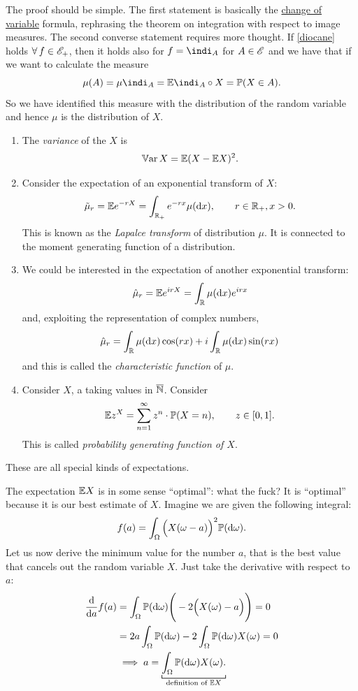 \documentclass{report}
\begin{document}
\begin{fancyproof}
	The proof should be simple. The first statement is basically the \hyperref[eh]{change of variable} formula, rephrasing the theorem on integration with respect to image measures.
	The second converse statement requires more thought. If \ref{diocane} holds $\forall\, f\in\mathscr{E}_+$, then it holds also for $f=\indi_A$ for $A\in\mathscr{E}$ and we have that if we want to calculate the measure 
	\[\mu(A)=\mu\indi_A=\ev\indi_A\circ X=\pr(X\in A).\]
	So we have identified this measure with the distribution of the random variable and hence $\mu$ is the distribution of $X$.
\end{fancyproof}
\begin{example}
	\begin{enumerate}[\circnum]
		\item The \emph{variance} of the \rv{} $X$ is
		\[\mathbb{V}\mathrm{ar}\, X=\mathbb{E}(X-\mathbb{E} X)^2.\]
		\item Consider the expectation of an exponential transform of $X$:
		\[\tilde{\mu}_r=\mathbb{E} e^{-rX}=\int_{\mathbb{R}_+}e^{-rx}\mu(\mathop{}\!\mathrm{d} x),\qquad r\in\mathbb{R}_+,x>0.\]
		This is known as the \emph{Lapalce transform} of distribution $\mu$. It is connected to the moment generating function of a distribution.
		\item We could be interested in the expectation of another exponential transform:
		\[\hat{\mu}_r=\mathbb{E} e^{irX}=\int_{\mathbb{R}}\mu(\mathop{}\!\mathrm{d} x)e^{irx}\]
		and, exploiting the representation of complex numbers,
		\[\hat{\mu}_r=\int_{\mathbb{R}}\mu(\mathop{}\!\mathrm{d} x)\cos(rx)+i\int_{\mathbb{R}}\mu(\mathop{}\!\mathrm{d} x)\sin(rx)\]
		and this is called the \emph{characteristic function} of $\mu$.
		\item Consider $X$, a \rv{} taking values in $\overline{\mathbb{N}}$. Consider
		\[\mathbb{E} z^X=\sum_{n=1}^{\infty}z^n\cdot\mathbb{P}(X=n),\qquad z\in[0,1].\]
		This is called \emph{probability generating function of $X$}.
	\end{enumerate}
	These are all special kinds of expectations.
\end{example}
\begin{remark}
	The expectation $\mathbb{E} X$ is in some sense ``optimal'': what the fuck? It is ``optimal'' because it is our best estimate of $X$. Imagine we are given the following integral:
	\[f(a)=\int_\Omega \Big(X(\omega-a)\Big)^2\mathbb{P}(\mathop{}\!\mathrm{d}\omega).\]
	Let us now derive the minimum value for the number $a$, that is the best value that cancels out the random variable $X$. Just take the derivative with respect to $a$:
	\begin{align*}
		\frac{\dif}{\dif a}f(a)&=\int_\Omega\pr(\dw)\Bigg(-2\Big(X(\omega)-a\Big)\Bigg)=0\\
		&=2a\int_\Omega\pr(\dw)-2\int_\Omega\pr(\dw)X(\omega)=0\\
		&\implies a= \underbracket[0.6pt]{\int_\Omega\pr(\dw)X(\omega).}_{\mathclap{\text{definition of }\ev X}}
	\end{align*}
\end{remark}
\end{document}
